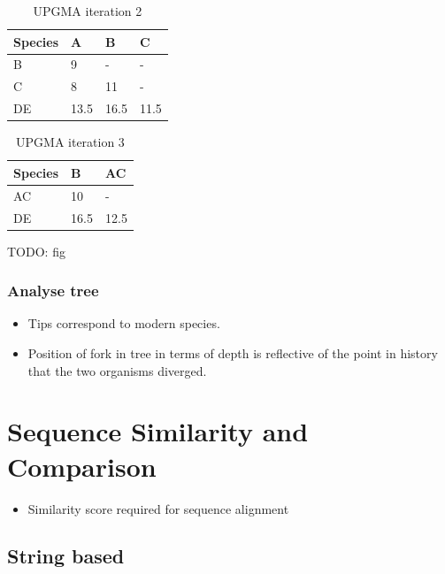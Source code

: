 \documentclass[a4paper]{article}
\begin{document}
\begin{table}[h!]
  \centering
  \begin{tabular}{@{}llll@{}}
    \toprule
    Species & A    & B    & C    \\
    \midrule
    B       & 9    & -    & -    \\
    C       & 8    & 11   & -    \\
    DE      & 13.5 & 16.5 & 11.5 \\
    \bottomrule
  \end{tabular}
  \caption{UPGMA iteration 2}
  \label{tab:upgma_2}
\end{table}
\FloatBarrier

\begin{table}[h!]
  \centering
  \begin{tabular}{@{}lll@{}}
    \toprule
    Species & B    & AC   \\
    \midrule
    AC      & 10   & -    \\
    DE      & 16.5 & 12.5 \\
    \bottomrule
  \end{tabular}
  \caption{UPGMA iteration 3}
  \label{tab:upgma_3}
\end{table}
\FloatBarrier

TODO: fig

\subsubsection{Analyse tree}

\begin{itemize}
  \item
    Tips correspond to modern species.

  \item
    Position of fork in tree in terms of depth is reflective of the point in
    history that the two organisms diverged.

\end{itemize}

\section{Sequence Similarity and Comparison}

\begin{itemize}
  \item Similarity score required for sequence alignment
\end{itemize}

\subsection{String based}
\end{document}
